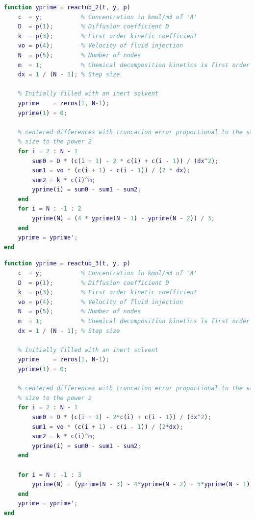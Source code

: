 \documentclass{article}
\begin{document}
\begin{lstlisting}[language=Matlab, caption=reactub2]
%% TUBULAR REACTOR adapted from (jose lopez salinas)'s solution
function yprime = reactub_2(t, y, p)
    c  = y;           % Concentration in kmol/m3 of 'A'
    D  = p(1);        % Diffusion coefficient D
    k  = p(3);        % First order kinetic coefficient
    vo = p(4);        % Velocity of fluid injection
    N  = p(5);        % Number of nodes
    m  = 1;           % Chemical decomposition kinetics is first order
    dx = 1 / (N - 1); % Step size
    
    % Initially filled with an inert solvent
    yprime    = zeros(1, N-1);
    yprime(1) = 0;
    
    % centered differences with truncation error proportional to the step
    % size to the power 2
    for i = 2 : N - 1
        sum0 = D * (c(i + 1) - 2 * c(i) + c(i - 1)) / (dx^2);
        sum1 = vo * (c(i + 1) - c(i - 1)) / (2 * dx);
        sum2 = k * c(i)^m;
        yprime(i) = sum0 - sum1 - sum2;
    end
    for i = N : -1 : 2
        yprime(N) = (4 * yprime(N - 1) - yprime(N - 2)) / 3;
    end
    yprime = yprime';
end
\end{lstlisting}

\begin{lstlisting}[language=Matlab, caption=reactub3]
%% TUBULAR REACTOR adapted from (jose lopez salinas)'s solution
function yprime = reactub_3(t, y, p)
    c  = y;           % Concentration in kmol/m3 of 'A'
    D  = p(1);        % Diffusion coefficient D
    k  = p(3);        % First order kinetic coefficient
    vo = p(4);        % Velocity of fluid injection
    N  = p(5);        % Number of nodes
    m  = 1;           % Chemical decomposition kinetics is first order
    dx = 1 / (N - 1); % Step size
    
    % Initially filled with an inert solvent
    yprime    = zeros(1, N-1);
    yprime(1) = 0;
    
    % centered differences with truncation error proportional to the step
    % size to the power 2
    for i = 2 : N - 1
        sum0 = D * (c(i + 1) - 2*c(i) + c(i - 1)) / (dx^2);
        sum1 = vo * (c(i + 1) - c(i - 1)) / (2*dx);
        sum2 = k * c(i)^m;
        yprime(i) = sum0 - sum1 - sum2;
    end
    
    for i = N : -1 : 3
        yprime(N) = (yprime(N - 3) - 4*yprime(N - 2) + 5*yprime(N - 1)) / 2;
    end
    yprime = yprime';
end
\end{lstlisting}
\end{document}
